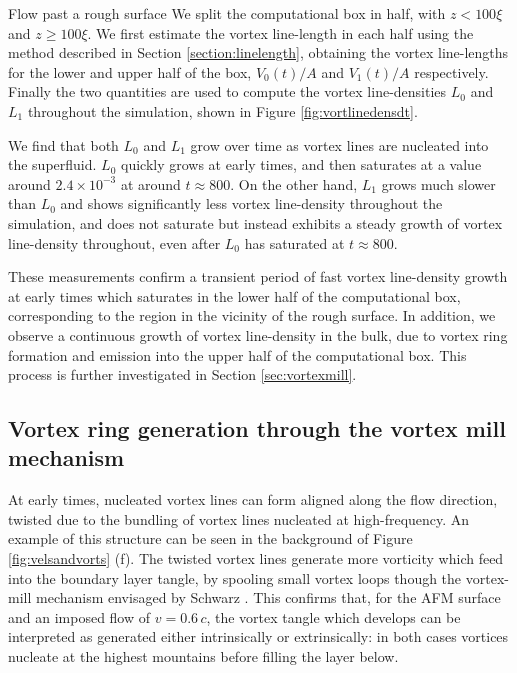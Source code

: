 \begin{chapter}{\label{cha:afm}Flow past a rough surface}
We split the computational box in half, with $z<100\xi$ and $z \geq 100\xi$. We first estimate the vortex line-length in each half using the method described in Section \ref{section:linelength}, obtaining the vortex line-lengths for the lower and upper half of the box, $V_0(t)/A$ and $V_1(t)/A$ respectively. Finally the two quantities are used to compute the vortex line-densities $L_0$ and $L_1$ throughout the simulation, shown in Figure \ref{fig:vortlinedensdt}.

We find that both $L_0$ and $L_1$ grow over time as vortex lines are nucleated into the superfluid. $L_0$ quickly grows at early times, and then saturates at a value around $2.4\times 10^{-3}$ at around $t \approx 800$. On the other hand, $L_1$ grows much slower than $L_0$ and shows significantly less vortex line-density throughout the simulation, and does not saturate but instead exhibits a steady growth of vortex line-density throughout, even after $L_0$ has saturated at $t \approx 800$.

These measurements confirm a transient period of fast vortex line-density growth at early times which saturates in the lower half of the computational box, corresponding to the region in the vicinity of the rough surface. In addition, we observe a continuous growth of vortex line-density in the bulk, due to vortex ring formation and emission into the upper half of the computational box. This process is further investigated in Section \ref{sec:vortexmill}.

\subsection{\label{sec:vortexmill}Vortex ring generation through the vortex mill mechanism}
At early times, nucleated vortex lines can form aligned along the flow direction, twisted due to the bundling of vortex lines nucleated at high-frequency. An example of this structure can be seen in the background of Figure \ref{fig:velsandvorts} (f). The twisted vortex lines generate more vorticity which feed into the boundary layer tangle, by spooling small vortex loops though the vortex-mill mechanism envisaged by Schwarz \cite{PhysRevLett.64.1130}. This confirms that, for the AFM surface and an imposed flow of $v=0.6\,c$, the vortex tangle which develops can be interpreted as generated either intrinsically or extrinsically: in both cases vortices nucleate at the highest mountains before filling the layer below.


\end{chapter}
